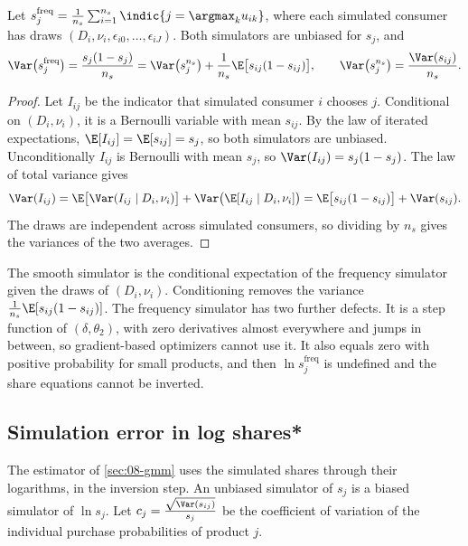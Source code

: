 \begin{lemma}\label{lem:08-smooth}
Let $s^{\text{freq}}_j = \frac{1}{n_s}\sum_{i=1}^{n_s}\indic\{j = \argmax_{k} u_{ik}\}$, where each simulated
consumer has draws $(D_i, \nu_i, \epsilon_{i0}, \dots, \epsilon_{iJ})$. Both simulators are unbiased for $s_j$, and
\begin{equation}\label{eq:08-rao-blackwell}
  \Var\bigl(s^{\text{freq}}_j\bigr) = \frac{s_j(1 - s_j)}{n_s}
  = \Var\bigl(s^{n_s}_j\bigr) + \frac{1}{n_s}\E\bigl[s_{ij}(1 - s_{ij})\bigr],
  \qquad \Var\bigl(s^{n_s}_j\bigr) = \frac{\Var(s_{ij})}{n_s}.
\end{equation}
\end{lemma}

\begin{proof}
Let $I_{ij}$ be the indicator that simulated consumer $i$ chooses $j$. Conditional on $(D_i, \nu_i)$, it is a
Bernoulli variable with mean $s_{ij}$. By the law of iterated expectations, $\E[I_{ij}] = \E[s_{ij}] = s_j$, so
both simulators are unbiased. Unconditionally $I_{ij}$ is Bernoulli with mean $s_j$, so $\Var(I_{ij}) = s_j(1 -
s_j)$. The law of total variance gives
\begin{equation*}
  \Var(I_{ij}) = \E\bigl[\Var(I_{ij} \mid D_i, \nu_i)\bigr] + \Var\bigl(\E[I_{ij} \mid D_i, \nu_i]\bigr)
              = \E\bigl[s_{ij}(1 - s_{ij})\bigr] + \Var(s_{ij}).
\end{equation*}
The draws are independent across simulated consumers, so dividing by $n_s$ gives the variances of the two
averages.
\end{proof}

The smooth simulator is the conditional expectation of the frequency simulator given the draws of $(D_i,
\nu_i)$. Conditioning removes the variance $\frac{1}{n_s}\E[s_{ij}(1 - s_{ij})]$. The frequency simulator has two
further defects. It is a step function of $(\delta, \theta_2)$, with zero derivatives almost everywhere and jumps
in between, so gradient-based optimizers cannot use it. It also equals zero with positive probability for small
products, and then $\ln s^{\text{freq}}_j$ is undefined and the share equations cannot be inverted.

\subsection{Simulation error in log shares*}\label{sec:08-simbias}

The estimator of \cref{sec:08-gmm} uses the simulated shares through their logarithms, in the inversion step. An
unbiased simulator of $s_j$ is a biased simulator of $\ln s_j$. Let $c_j = \frac{\sqrt{\Var(s_{ij})}}{s_j}$ be the
coefficient of variation of the individual purchase probabilities of product $j$.

